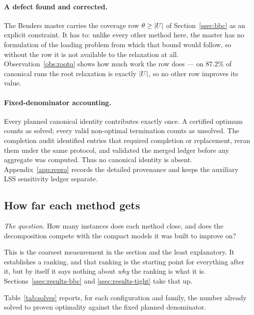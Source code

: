 \paragraph{A defect found and corrected.}
The Benders master carries the coverage row $\theta\ge\lvert U\rvert$ of
Section~\ref{ssec:bbc} as an explicit constraint. It has to: unlike every other method
here, the master has no formulation of the loading problem from which that bound would
follow, so without the row it is not available to the relaxation at all.
Observation~\ref{obs:rootq} shows how much work the row does --- on $87.2\%$ of canonical runs the
root relaxation is exactly $\lvert U\rvert$, so no other row improves its value.

\paragraph{Fixed-denominator accounting.}
Every planned canonical identity contributes exactly once. A certified optimum counts
as solved; every valid non-optimal termination counts as unsolved. The completion audit
identified entries that required completion or replacement, reran them under the same
protocol, and validated the merged ledger before any aggregate was computed. Thus no
canonical identity is absent. Appendix~\ref{app:repro} records the detailed provenance
and keeps the auxiliary LSS sensitivity ledger separate.

\subsection{How far each method gets}\label{ssec:results-solved}

\emph{The question.} How many instances does each method close, and does the
decomposition compete with the compact models it was built to improve on?

This is the coarsest measurement in the section and the least explanatory. It
establishes a ranking, and that ranking is the starting point for everything after it,
but by itself it says nothing about \emph{why} the ranking is what it is.
Sections~\ref{ssec:results-bbc} and \ref{ssec:results-tight} take that up.

Table~\ref{tab:solves} reports, for each configuration and family, the number already
solved to proven optimality against the fixed planned denominator.


